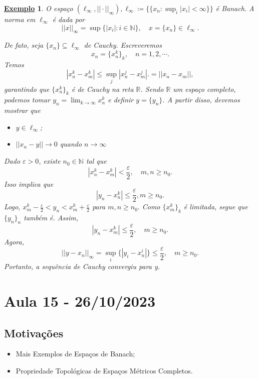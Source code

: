 \documentclass{article}
\newtheorem{example}{\underline{Exemplo}}
\begin{document}
\begin{example}
  O espaço \((\ell_{\infty}, ||\cdot ||_{\infty}), \ell_{\infty}\coloneqq \biggl\{\{x_{n}:\sup_{i}|x_{i}|<\infty\}\biggr\}\) é Banach. A norma em \(\ell_{\infty}\) é dada por 
  \[
    ||x||_{\infty}=\sup\{|x_{i}|:i\in \mathbb{N}\},\quad x = \{x_{n}\}\in \ell_{\infty}.
  \]

  De fato, seja \(\{x_{n}\}\subseteq{\ell_{\infty}}\) de Cauchy. Escreveremos 
  \[
    x_{n} = \{x_{n}^{k}\}_{k}, \quad n = 1, 2, \cdots.
  \]
  Temos 
  \[
    |x_{n}^{k}-x_{m}^{k}|\leq \sup_{j}|x_{n}^{j}-x_{m}^{j} |. = ||x_{n}-x_{m}||,
  \]
garantindo que \(\{x_{n}^{k}\}_{k}\) é de Cauchy na reta \(\mathbb{R}\). Sendo \(\mathbb{R}\) um espaço completo, podemos tomar
 \(y_{n} = \lim_{k\to \infty}x_{n}^{k}\) e definir \(y = \{y_{n}\}\). A partir disso, devemos mostrar que 
\begin{itemize}
  \item[1)] \(y\in \ell_{\infty}\);
  \item[2)] \(||x_{n}-y||\longrightarrow 0\) quando \(n\longrightarrow\infty\)
\end{itemize}
  Dado \(\varepsilon > 0\), existe \(n_{0}\in \mathbb{N}\) tal que 
  \[
    |x_{n}^{k}-x_{m}^{k}| < \frac{\varepsilon }{2},\quad m,n\geq n_{0}.
  \]
  Isso implica que 
  \[
    |y_{n}-x_{n}^{k}|\leq \frac{\varepsilon }{2}, m\geq n_{0}.
  \]
  Logo, \(x_{m}^{k}-\frac{\varepsilon }{2} < y_{n} < x_{m}^{k}+\frac{\varepsilon }{2}\) para \(m, n\geq n_{0}.\) Como
  \(\{x_{m}^{k}\}_{k}\) é limitada, segue que \(\{y_{n}\}_{n}\) também é. Assim, 
  \[
    |y_{n}-x_{m}^{k}|\leq \frac{\varepsilon }{2},\quad m\geq n_{0}.
  \]
  Agora, 
  \[
    ||y-x_{n}||_{\infty}=\sup_{i}\{|y_{i}-x_{n}^{i}|\}\leq \frac{\varepsilon }{2},\quad m\geq n_{0}.
  \] 
  Portanto, a sequência de Cauchy convergiu para y.
\end{example}
\newpage

\section{Aula 15 - 26/10/2023}
\subsection{Motivações}
\begin{itemize}
  \item Mais Exemplos de Espaços de Banach;
  \item Propriedade Topológicas de Espaços Métricos Completos.
\end{itemize}
\end{document}
